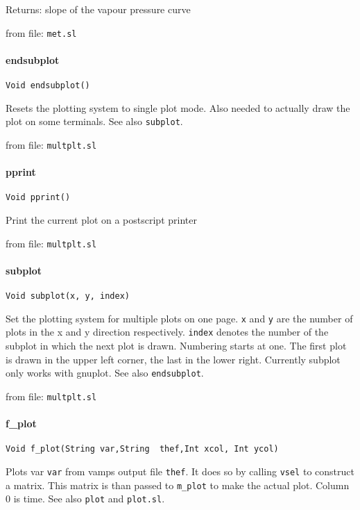 Returns: slope of the vapour pressure curve

from file: {\tt met.sl}


\paragraph{endsubplot}
\begin{verbatim}
Void endsubplot()
\end{verbatim}
Resets the plotting system to single plot mode. Also needed to actually
draw the plot on some terminals. See also {\tt subplot}.

from file: {\tt multplt.sl}


\paragraph{pprint}
\begin{verbatim}
Void pprint()
\end{verbatim}
Print the current plot on a postscript printer

from file: {\tt multplt.sl}


\paragraph{subplot}
\begin{verbatim}
Void subplot(x, y, index)
\end{verbatim}
Set the plotting system for multiple plots on one page. {\tt x} and {\tt y} are the
number of plots in the x and y direction respectively. {\tt index} denotes the
number of the subplot in which the next plot is drawn. Numbering starts
at one.  The first plot is drawn in the upper left corner, the last in the
lower right. Currently subplot only works with gnuplot. See also
{\tt endsubplot}.

from file: {\tt multplt.sl}


\paragraph{f\_plot}
\begin{verbatim}
Void f_plot(String var,String  thef,Int xcol, Int ycol)
\end{verbatim}
Plots var {\tt var} from vamps output file {\tt thef}.
It does so by calling {\tt vsel} to construct a matrix. This
matrix is than passed to {\tt m\_plot} to make the actual plot.
Column 0 is time.
See also {\tt plot} and {\tt plot.sl}.

